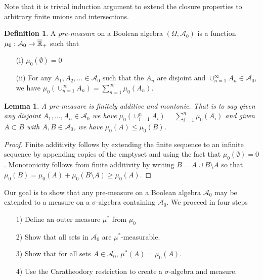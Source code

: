 \documentclass{amsart}
\newtheorem{lem}[thm]{Lemma}
\theoremstyle{remark}
\theoremstyle{definition}
\newtheorem{defn}[thm]{Definition}
\begin{document}
Note that it is trivial induction argument to extend the closure
properties to arbitrary finite unions and intersections.

\begin{defn}A \emph{pre-measure} on a Boolean algebra $(\Omega, \mathcal{A}_0)$ is
  a function $\mu_0 : \mathcal{A}_0 \to \overline{\mathbb{R}}_+$ such that 
\begin{itemize}
\item[(i)]$\mu_0(\emptyset) = 0$
\item[(ii)]For any $A_1, A_2, \dotsc \in \mathcal{A}_0$ such that the
  $A_n$ are disjoint and 
  $\cup_{n=1}^\infty A_n \in \mathcal{A}_0$, we have
  $\mu_0(\cup_{n=1}^\infty A_n) = \sum_{n=1}^\infty \mu_0(A_n)$.
\end{itemize}
\end{defn}

\begin{lem}A pre-measure is finitely additive and montonic.  That is to say given
  any disjoint $A_1, \dotsc, A_n \in \mathcal{A}_0$ we have
  $\mu_0(\cup_{i=1}^n A_i) = \sum_{i=1}^n \mu_0(A_i)$ and given $A
  \subset B$ with $A, B \in \mathcal{A}_0$, we have $\mu_0(A) \leq \mu_0(B)$.
\end{lem}
\begin{proof}
Finite additivity follows by extending the finite sequence to an infinite sequence by appending
copies of the emptyset and using the fact that $\mu_0(\emptyset)=0$.  Monotonicity follows from finite additivity by writing $B = A \cup
B\setminus A$ so that $\mu_0(B) = \mu_0(A) + \mu_0(B\setminus A) \geq \mu_0(A)$.
\end{proof}

Our goal is to show that any pre-measure on a Boolean algebra
$\mathcal{A}_0$ may be
extended to a measure on a $\sigma$-algebra containing
$\mathcal{A}_0$.  We proceed in four steps
\begin{itemize}
\item[1)] Define an outer measure $\mu^*$ from $\mu_0$
\item[2)] Show that all sets in $\mathcal{A}_0$ are $\mu^*$-measurable.
\item[3)] Show that for all sets $A \in \mathcal{A}_0$, $\mu^*(A) = \mu_0(A)$.
\item[4)] Use the Caratheodory restriction to create a
  $\sigma$-algebra and measure.
\end{itemize}
\end{document}
